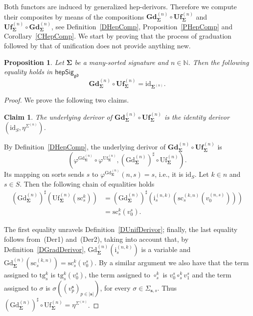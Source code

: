 \documentclass[a4paper, reqno
]{amsart}
\newcommand{\bb}[1]{\ensuremath{\lvert #1 \rvert}}
\newcommand{\sig}[1]{\mathbf{#1}}             %
\newcommand{\id}{\mathrm{id}}
\newcommand{\gd}{\mathfrak{gd}}              %
\newcommand{\src}{\mathrm{sc}}
\newcommand{\tgt}{\mathrm{tg}}
\newcommand{\Gd}{\mathrm{Gd}}
\newcommand{\Uf}{\mathrm{Uf}}
\newcommand{\bGd}{\mathbf{Gd}}
\newcommand{\bUf}{\mathbf{Uf}}
\theoremstyle{plain}
\newtheorem{proposition}[theorem]{Proposition}
\newtheorem{claim}[theorem]{Claim}
\theoremstyle{definition}
\begin{document}
Both functors are induced by generalized hep-derivors.
Therefore we compute their composites by means of the compositions $\bGd^{(n)}_{\sig{\Sigma}}\circ\bUf^{(n)}_{\sig{\Sigma}}$ and $\bUf^{(n)}_{\sig{\Sigma}}\circ\bGd^{(n)}_{\sig{\Sigma}}$, see Definition~\ref{DHepComp}, Proposition~\ref{PHepComp} and Corollary~\ref{CHepComp}.
We start by proving that the process of graduation followed by that of unification does not provide anything new.

\begin{proposition}\label{PUnifGrad}
Let $\sig{\Sigma}$ be a many-sorted signature and $n\in\mathbb{N}$.
Then the following equality holds in $\mathsf{hepSig}_{\gd}$
$$
\bGd^{(n)}_{\sig{\Sigma}}\circ\bUf^{(n)}_{\sig{\Sigma}}=\id_{\sig{\Sigma}^{(n)}}.
$$
\end{proposition}
\begin{proof}
We prove the following two claims.

\begin{claim}\label{CUnifGradA}
The underlying derivor of $\bGd^{(n)}_{\sig{\Sigma}}\circ\bUf^{(n)}_{\sig{\Sigma}}$ is the identity derivor $(\id_{S},\eta^{\Sigma^{(n)}})$.
\end{claim}

By Definition~\ref{DHepComp}, the underlying derivor of $\bGd^{(n)}_{\sig{\Sigma}}\circ\bUf^{(n)}_{\sig{\Sigma}}$ is
$$
\left(\varphi^{\Gd^{(n)}_{\sig{\Sigma}}}\circ\varphi^{\Uf^{(n)}_{\sig{\Sigma}}},\left(\Gd^{(n)}_{\sig{\Sigma}}\right)^{\sharp}\circ\Uf^{(n)}_{\sig{\Sigma}}\right).
$$
Its mapping on sorts sends $s$ to $\varphi^{\Gd^{(n)}_{\sig{\Sigma}}}(n,s)=s$, i.e., it is $\id_{S}$.
Let $k\in n$ and $s\in S$.
Then the following chain of equalities holds
\begin{align*}
\left(\Gd^{(n)}_{\sig{\Sigma}}\right)^{\sharp}\left(\Uf^{(n)}_{\sig{\Sigma}}\left(\src^{k}_{s}\right)\right)
&=
\left(\Gd^{(n)}_{\sig{\Sigma}}\right)^{\sharp}\left(\mathrm{i}^{(n,k)}_{s}\left(\src^{(k,n)}_{s}(v^{(n,s)}_{0})\right)\right)
\tag{1}
\\&=
\src^{k}_{s}(v^{s}_{0}).
\tag{2}
\end{align*}

The first equality unravels Definition~\ref{DUnifDerivor}; finally, the last equality follows from~(Der1) and~(Der2), taking into account that, by Definition~\ref{DGradDerivor}, $\Gd^{(n)}_{\sig{\Sigma}}(\mathrm{i}^{(n,k)}_{s})$ is a variable and $\Gd^{(n)}_{\sig{\Sigma}}(\src^{(k,n)}_{s})=\src^{k}_{s}(v^{s}_{0})$.
By a similar argument we also have that the term assigned to $\tgt^{k}_{s}$ is $\tgt^{k}_{s}(v^{s}_{0})$, the term assigned to $\circ^{k}_{s}$ is $v^{s}_{0}\circ^{k}_{s}v^{s}_{1}$ and the term assigned to $\sigma$ is $\sigma((v^{\mathbf{s}}_{p})_{p\in\bb{\mathbf{s}}})$, for every $\sigma\in\Sigma_{\mathbf{s},s}$.
Thus $(\Gd^{(n)}_{\sig{\Sigma}})^{\sharp}\circ\Uf^{(n)}_{\sig{\Sigma}}=\eta^{\Sigma^{(n)}}$.


\end{proof}
\end{document}

